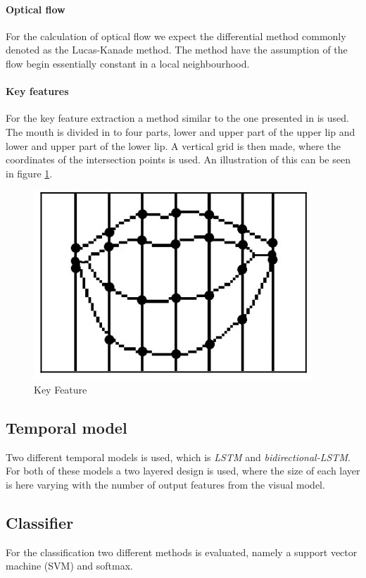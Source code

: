 \paragraph{Optical flow}
For the calculation of optical flow we expect the differential method commonly denoted as the Lucas-Kanade method\cite{Lucas1981}.
The method have the assumption of the flow begin essentially constant in a local neighbourhood.

\paragraph{Key features}
For the key feature extraction a method similar to the one presented in \cite{Li2008} is used.
The mouth is divided in to four parts, lower and upper part of the upper lip and lower and upper part of the lower lip.
A vertical grid is then made, where the coordinates of the intersection points is used.
An illustration of this can be seen in figure \ref{fig:keyFeature}.
\begin{figure}[h]
    \centering
    \includegraphics[width=0.5\columnwidth]{fig/keyFeature.jpg}
    \caption{Key Feature\cite{Li2008}}
    \label{fig:keyFeature}
\end{figure}

\subsection{Temporal model}
Two different temporal models is used, which is \textit{LSTM} and \textit{bidirectional-LSTM}.
For both of these models a two layered design is used, where the size of each layer is here varying with the number of output features from the visual model.

\subsection{Classifier}
For the classification two different methods is evaluated, namely a support vector machine (SVM) and softmax.


